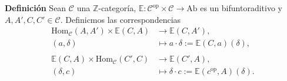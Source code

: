 \documentclass[preview]{standalone}
\begin{document}
\begin{center}
\flushleft \textbf{Definición} Sean $\mathscr{C}$ una $\mathbb{Z}$-categoría, $\mathbb{E}:\mathscr{C}^\text{op}\times\mathscr{C}\to\text{Ab}$ es un bifuntoraditivo y $A,A',C,C'\in\mathscr{C}$. Definicmos las correspondencias \begin{align*} \text{Hom}_\mathscr{C}(A,A')\times\mathbb{E}(C,A) &\to \mathbb{E}(C,A'), \\ (a,\delta) &\mapsto a\cdot\delta:=\mathbb{E}(C,a)(\delta), \\ \\ \mathbb{E}(C,A)\times\text{Hom}_\mathscr{C}(C',C) &\to \mathbb{E}(C',A), \\ (\delta,c) &\mapsto \delta\cdot c:=\mathbb{E}(c^\text{op},A)(\delta). \end{align*}
\end{center}
\end{document}
